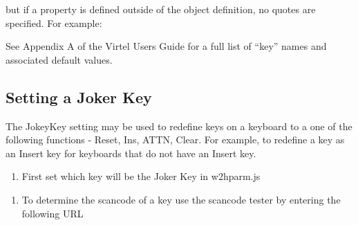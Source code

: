 \documentclass[letterpaper,10pt,english]{sphinxmanual}
\begin{document}
\begin{sphinxVerbatim}[commandchars=\\\{\}]
   
\end{sphinxVerbatim}

but if a property is defined outside of the object definition, no quotes are specified. For example:

\begin{sphinxVerbatim}[commandchars=\\\{\}]
  
\end{sphinxVerbatim}

See Appendix A of the Virtel Users Guide for a full list of “key” names and associated default values.

\ignorespaces 

\subsection{Setting a Joker Key}
\label{\detokenize{Customization:setting-a-joker-key}}\label{\detokenize{Customization:index-1}}
The JokeyKey setting may be used to redefine keys on a keyboard to a one of the following functions - Reset, Ins, ATTN, Clear. For example, to redefine a key as an Insert key for keyboards that do not have an Insert key.
\begin{enumerate}
\def\theenumi{\arabic{enumi}}
\def\labelenumi{\theenumi .}
\makeatletter\def\p@enumii{\p@enumi \theenumi .}\makeatother
\item {} 
First set which key will be the Joker Key in w2hparm.js

\end{enumerate}

\begin{sphinxVerbatim}[commandchars=\\\{\}]
           
\end{sphinxVerbatim}
\begin{enumerate}
\def\theenumi{\arabic{enumi}}
\def\labelenumi{\theenumi .}
\makeatletter\def\p@enumii{\p@enumi \theenumi .}\makeatother
\setcounter{enumi}{1}
\item {} 
To determine the scancode of a key use the scancode tester by entering the following URL

\end{enumerate}
\end{document}
